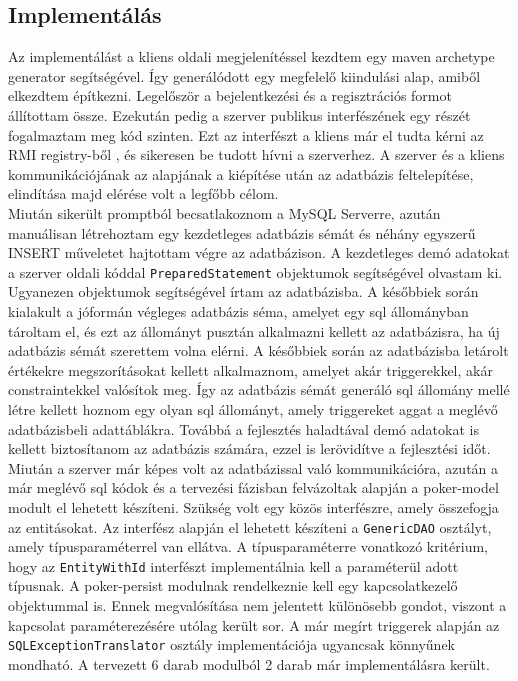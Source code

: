 \subsection{Implementálás}
Az implementálást a kliens oldali megjelenítéssel kezdtem egy maven archetype generator segítségével. Így generálódott egy megfelelő kiindulási alap, amiből elkezdtem építkezni. Legelőször a bejelentkezési és a regisztrációs formot állítottam össze. Ezekután pedig a szerver publikus interfészének egy részét fogalmaztam meg kód szinten. Ezt az interfészt a kliens már el tudta kérni az RMI registry-ből \cite{RMI}, és sikeresen be tudott hívni a szerverhez. A szerver és a kliens kommunikációjának az alapjának a kiépítése után az adatbázis feltelepítése, elindítása majd elérése volt a legfőbb célom. \\
Miután sikerült promptból becsatlakoznom a MySQL Serverre, azután manuálisan létrehoztam egy kezdetleges adatbázis sémát és néhány egyszerű INSERT műveletet hajtottam végre az adatbázison. A kezdetleges demó adatokat a szerver oldali kóddal \texttt{PreparedStatement} objektumok segítségével olvastam ki. Ugyanezen objektumok segítségével írtam az adatbázisba. A későbbiek során kialakult a jóformán végleges adatbázis séma, amelyet egy sql állományban tároltam el, és ezt az állományt pusztán alkalmazni kellett az adatbázisra, ha új adatbázis sémát szerettem volna elérni. A későbbiek során az adatbázisba letárolt értékekre megszorításokat kellett alkalmaznom, amelyet akár triggerekkel, akár constraintekkel valósítok meg. Így az adatbázis sémát generáló sql állomány mellé létre kellett hoznom egy olyan sql állományt, amely triggereket aggat a meglévő adatbázisbeli adattáblákra. Továbbá a fejlesztés haladtával demó adatokat is kellett biztosítanom az adatbázis számára, ezzel is lerövidítve a fejlesztési időt. \\
Miután a szerver már képes volt az adatbázissal való kommunikációra, azután a már meglévő sql kódok és a tervezési fázisban felvázoltak alapján a poker-model modult el lehetett készíteni. Szükség volt egy közös interfészre, amely összefogja az entitásokat. Az interfész alapján el lehetett készíteni a \texttt{GenericDAO} osztályt, amely típusparaméterrel van ellátva. A típusparaméterre vonatkozó kritérium, hogy az \texttt{EntityWithId} interfészt implementálnia kell a paraméterül adott típusnak. A poker-persist modulnak rendelkeznie kell egy kapcsolatkezelő objektummal is. Ennek megvalósítása nem jelentett különösebb gondot, viszont a kapcsolat paraméterezésére utólag került sor. A már megírt triggerek alapján az \texttt{SQLExceptionTranslator} osztály implementációja ugyancsak könnyűnek mondható. A tervezett 6 darab modulból 2 darab már implementálásra került. \\
